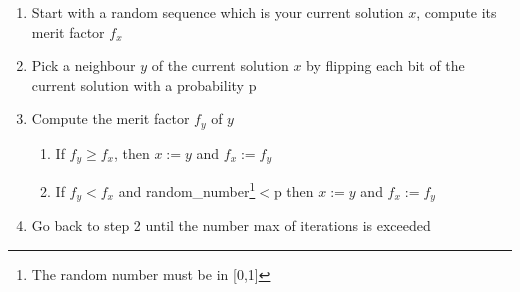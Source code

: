 \documentclass[a4paper,11pt,openany]{article}
\begin{document}
\begin{enumerate}
\item Start with a random sequence which is your current solution $x$, compute its merit factor $f_x$
\item Pick a neighbour $y$ of the current solution $x$ by flipping each bit of the current solution with a probability p
\item Compute the merit factor $f_y$ of $y$
\begin{enumerate}
\item If $f_y\geq f_x$, then $x:=y$ and $f_x:=f_y$
\item If $f_y<f_x$ and random\_number\footnote{The random number must be in [0,1]}$<$p then $x:=y$ and $f_x:=f_y$
\end{enumerate}
\item Go back to step 2 until the number max of iterations is exceeded
\end{enumerate}
\end{document}
